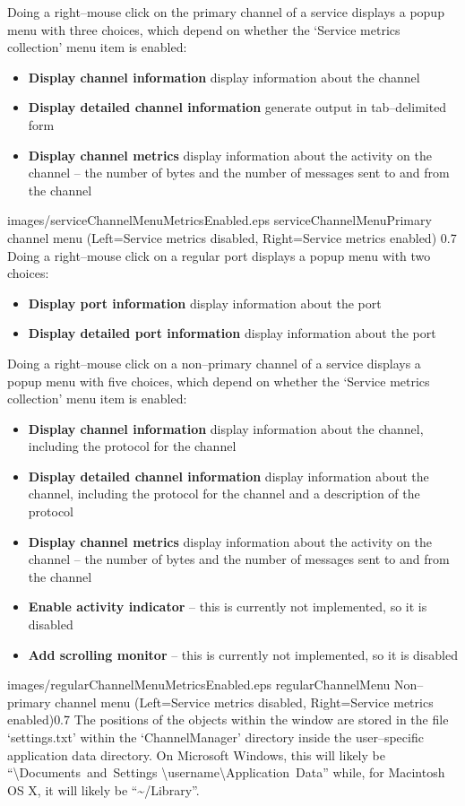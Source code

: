 Doing a right--mouse click on the primary channel of a service displays a popup menu with
three choices, which depend on whether the `Service metrics collection' menu item is
enabled:
\begin{itemize}
\item \textbf{Display channel information} display information about the channel
\item \textbf{Display detailed channel information} generate output in tab--delimited form
\item \textbf{Display channel metrics} display information about the activity on the
channel -- the number of bytes and the number of messages sent to and from the channel
\end{itemize}
%
{images/serviceChannelMenuMetricsEnabled.eps}%
{serviceChannelMenu}{Primary channel menu (Left=Service metrics disabled, Right=Service metrics enabled)}%
{0.7}
\clearpage
Doing a right--mouse click on a regular port displays a popup menu with two choices:
\begin{itemize}
\item \textbf{Display port information} display information about the port
\item \textbf{Display detailed port information} display information about the port
\end{itemize}

Doing a right--mouse click on a non--primary channel of a service displays a popup menu
with five choices, which depend on whether the `Service metrics collection' menu item is
enabled:
\begin{itemize}
\item \textbf{Display channel information} display information about the channel,
including the protocol for the channel
\item \textbf{Display detailed channel information} display information about the channel,
including the protocol for the channel and a description of the protocol
\item \textbf{Display channel metrics} display information about the activity on the
channel -- the number of bytes and the number of messages sent to and from the channel
\item \textbf{Enable activity indicator} -- this is currently not implemented, so it is
disabled
\item \textbf{Add scrolling monitor} -- this is currently not implemented, so it is
disabled
\end{itemize}
%
{images/regularChannelMenuMetricsEnabled.eps}%
{regularChannelMenu}%
{Non--primary channel menu (Left=Service metrics disabled, Right=Service metrics enabled)}{0.7}
\clearpage
The positions of the objects within the window are stored in the file `settings.txt'
within the `ChannelManager' directory inside the user--specific application data
directory.
On Microsoft Windows, this will likely be ``\textbackslash{}Documents~and~Settings%
\textbackslash{}username\textbackslash{}Application~Data'' while, for Macintosh OS X, it
will likely be ``\textasciitilde/Library''.\\
\primaryEnd{}
